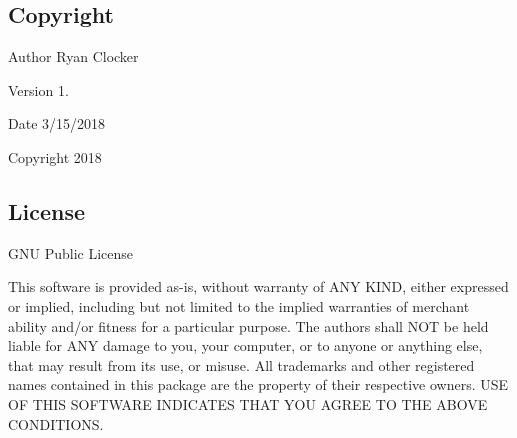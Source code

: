 \hypertarget{index_copyright}{}\subsection{Copyright}\label{index_copyright}
\begin{DoxyAuthor}{Author}
Ryan Clocker 
\end{DoxyAuthor}
\begin{DoxyVersion}{Version}
1. 
\end{DoxyVersion}
\begin{DoxyDate}{Date}
3/15/2018 
\end{DoxyDate}
\begin{DoxyCopyright}{Copyright}
2018
\end{DoxyCopyright}


\hypertarget{index_license}{}\subsection{License}\label{index_license}
G\+NU Public License

This software is provided as-\/is, without warranty of A\+NY K\+I\+ND, either expressed or implied, including but not limited to the implied warranties of merchant ability and/or fitness for a particular purpose. The authors shall N\+OT be held liable for A\+NY damage to you, your computer, or to anyone or anything else, that may result from its use, or misuse. All trademarks and other registered names contained in this package are the property of their respective owners. U\+SE OF T\+H\+IS S\+O\+F\+T\+W\+A\+RE I\+N\+D\+I\+C\+A\+T\+ES T\+H\+AT Y\+OU A\+G\+R\+EE TO T\+HE A\+B\+O\+VE C\+O\+N\+D\+I\+T\+I\+O\+NS. 